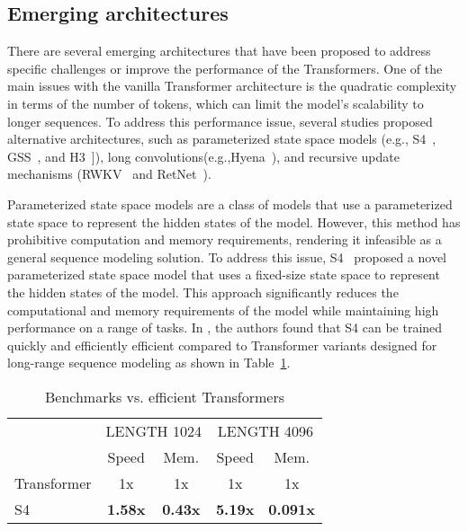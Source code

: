 \subsection{Emerging architectures}
\label{subsec:emerging-architectures}

There are several emerging architectures that have been proposed to address specific challenges or improve the performance of the Transformers.
One of the main issues with the vanilla Transformer architecture is the quadratic complexity in terms of the number of tokens, which can limit the model's scalability to longer sequences.
To address this performance issue, several studies proposed alternative architectures, such as parameterized state space models (e.g., S4~\cite{gu2022efficiently}, GSS~\cite{mehta2022long}, and H3~\cite{dao2022hungry}]), long convolutions(e.g.,Hyena~\cite{poli2023hyena}), and recursive update mechanisms (RWKV~\cite{peng2023rwkv} and RetNet~\cite{sun2023retentive}).

Parameterized state space models are a class of models that use a parameterized state space to represent the hidden states of the model.
However, this method has prohibitive computation and memory requirements, rendering it infeasible as a general sequence modeling solution.
To address this issue, S4~\cite{gu2022efficiently} proposed a novel parameterized state space model that uses a fixed-size state space to represent the hidden states of the model.
This approach significantly reduces the computational and memory requirements of the model while maintaining high performance on a range of tasks.
In \textcite{gu2022efficiently}, the authors found that S4 can be trained quickly and efficiently efficient compared to Transformer variants designed for long-range sequence modeling as shown in Table~\ref{tab:ssm_efficiency}.

\begin{table}[htbp]
	\centering
	\begin{tabularx}{0.6\textwidth}{Xcccc}
		\toprule
		            & \multicolumn{2}{c}{LENGTH 1024} & \multicolumn{2}{c}{LENGTH 4096}                                    \\
		\cmidrule(lr){2-3} \cmidrule(lr){4-5}
		            & Speed                           & Mem.                            & Speed          & Mem.            \\
		\midrule
		Transformer & 1x                              & 1x                              & 1x             & 1x              \\
		S4          & \textbf{1.58x}                  & \textbf{0.43x}                  & \textbf{5.19x} & \textbf{0.091x} \\
		\bottomrule
	\end{tabularx}
	\caption{Benchmarks vs. efficient Transformers}
	\label{tab:ssm_efficiency}
\end{table}

